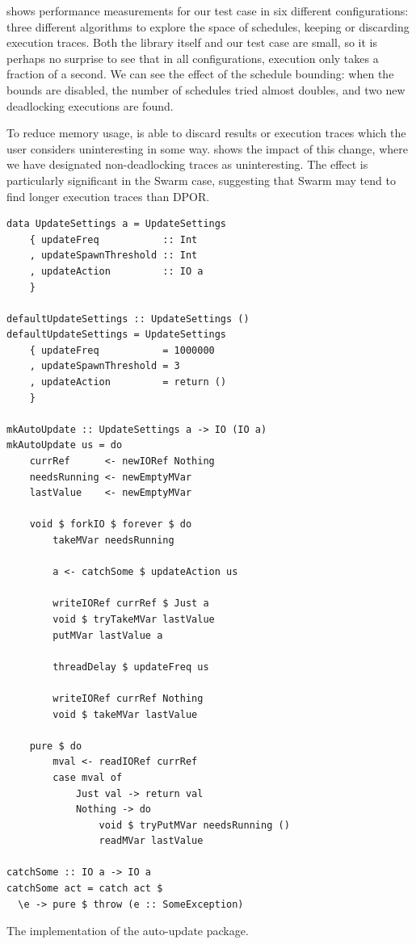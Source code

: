  shows performance measurements for our test
case in six different configurations: three different algorithms to
explore the space of schedules, keeping or discarding execution
traces.  Both the library itself and our test case are small, so it is
perhaps no surprise to see that in all configurations, execution only
takes a fraction of a second.  We can see the effect of the schedule
bounding: when the bounds are disabled, the number of schedules tried
almost doubles, and two new deadlocking executions are found.

To reduce memory usage, \dejafu{} is able to discard results or
execution traces which the user considers uninteresting in some way.
 shows the impact of this change, where we
have designated non-deadlocking traces as uninteresting.  The effect
is particularly significant in the Swarm case, suggesting that Swarm
may tend to find longer execution traces than DPOR.

\begin{listing}
  \centering
  \begin{minipage}{0.5\textwidth}
  \begin{verbatim}
data UpdateSettings a = UpdateSettings
    { updateFreq           :: Int
    , updateSpawnThreshold :: Int
    , updateAction         :: IO a
    }

defaultUpdateSettings :: UpdateSettings ()
defaultUpdateSettings = UpdateSettings
    { updateFreq           = 1000000
    , updateSpawnThreshold = 3
    , updateAction         = return ()
    }

mkAutoUpdate :: UpdateSettings a -> IO (IO a)
mkAutoUpdate us = do
    currRef      <- newIORef Nothing
    needsRunning <- newEmptyMVar
    lastValue    <- newEmptyMVar

    void $ forkIO $ forever $ do
        takeMVar needsRunning

        a <- catchSome $ updateAction us

        writeIORef currRef $ Just a
        void $ tryTakeMVar lastValue
        putMVar lastValue a

        threadDelay $ updateFreq us

        writeIORef currRef Nothing
        void $ takeMVar lastValue

    pure $ do
        mval <- readIORef currRef
        case mval of
            Just val -> return val
            Nothing -> do
                void $ tryPutMVar needsRunning ()
                readMVar lastValue

catchSome :: IO a -> IO a
catchSome act = catch act $
  \e -> pure $ throw (e :: SomeException)
  \end{verbatim}
  \end{minipage}
  \caption{The implementation of the auto-update package.}\label{lst:autoupdate}
\end{listing}


